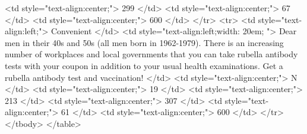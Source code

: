    <td style="text-align:center;"> 299 </td>
   <td style="text-align:center;"> 67 </td>
   <td style="text-align:center;"> 600 </td>
  </tr>
  <tr>
   <td style="text-align:left;"> Convenient </td>
   <td style="text-align:left;width: 20em; "> Dear men in their 40s and 50s (all men born in 1962-1979). There is an increasing number of workplaces and local governments that you can take rubella antibody tests with your coupon in addition to your usual health examinations. Get a rubella antibody test and vaccination! </td>
   <td style="text-align:center;"> N </td>
   <td style="text-align:center;"> 19 </td>
   <td style="text-align:center;"> 213 </td>
   <td style="text-align:center;"> 307 </td>
   <td style="text-align:center;"> 61 </td>
   <td style="text-align:center;"> 600 </td>
  </tr>
</tbody>
</table>

